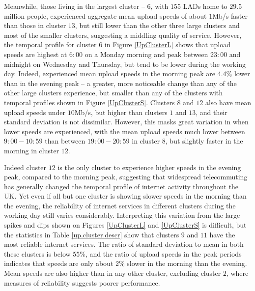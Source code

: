 \documentclass[Royal,times,sageh]{sagej}
\begin{document}
Meanwhile, those living in the largest cluster -- \(6\), with \(155\)
LADs home to \(29.5\) million people, experienced aggregate mean upload
speeds of about \(1\)Mb/s faster than those in cluster \(13\), but still
lower than the other three large clusters and most of the smaller
clusters, suggesting a middling quality of service. However, the
temporal profile for cluster \(6\) in Figure \ref{UpClusterL} shows that
upload speeds are highest at \(6:00\) on a Monday morning and peak
between \(23:00\) and midnight on Wednesday and Thursday, but tend to be
lower during the working day. Indeed, experienced mean upload speeds in
the morning peak are \(4.4\)\% lower than in the evening peak -- a
greater, more noticeable change than any of the other large clusters
experience, but smaller than any of the clusters with temporal profiles
shown in Figure \ref{UpClusterS}. Clusters \(8\) and \(12\) also have
mean upload speeds under \(10\)Mb/s, but higher than clusters \(1\) and
\(13\), and their standard deviation is not dissimilar. However, this
masks great variation in when lower speeds are experienced, with the
mean upload speeds much lower between \(9:00-10:59\) than between
\(19:00-20:59\) in cluster \(8\), but slightly faster in the morning in
cluster \(12\).

Indeed cluster \(12\) is the only cluster to experience higher speeds in
the evening peak, compared to the morning peak, suggesting that
widespread telecommuting has generally changed the temporal profile of
internet activity throughout the UK. Yet even if all but one cluster is
showing slower speeds in the morning than the evening, the reliability
of internet services in different clusters during the working day still
varies considerably. Interpreting this variation from the large spikes
and dips shown on Figures \ref{UpClusterL} and \ref{UpClusterS} is
difficult, but the statistics in Table \ref{up.cluster.descr} show that
clusters \(9\) and \(11\) have the most reliable internet services. The
ratio of standard deviation to mean in both these clusters is below
55\%, and the ratio of upload speeds in the peak periods indicates that
speeds are only about 2\% slower in the morning than the evening. Mean
speeds are also higher than in any other cluster, excluding cluster
\(2\), where measures of reliability suggests poorer performance.
\end{document}
